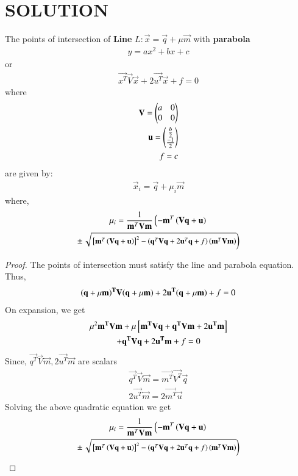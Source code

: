 \documentclass[journal,12pt,twocolumn]{IEEEtran}
\begin{document}
\section{SOLUTION}
\begin{lemma}
The points of intersection of \textbf{Line} $L:\vec{x}=\vec{q}+\mu\vec{m}$ with \textbf{parabola}
\begin{align}
    y=ax^2+bx+c
    \end{align}
    or
\begin{align}
\vec{x^T}\vec{V}\vec{x}+2\vec{u^T}\vec{x}+f=0
\end{align}
where
\begin{align}
    \mathbf{V}=\begin{pmatrix}a & 0 \\ 0 & 0\end{pmatrix}\\
    \mathbf{u}=\begin{pmatrix}\frac{b}{2}\\\frac{-1}{2}\end{pmatrix}\\
    f=c
\end{align}
are given by:
\begin{align}
\vec{x}_i = \vec{q}+\mu_i\vec{m}
\end{align}
%
where,
\begin{multline}
\mu_i = \frac{1}
{
\mathbf{m}^T\mathbf{V}\mathbf{m}
}
\left(-\mathbf{m}^T\left(\mathbf{V}\mathbf{q}+\mathbf{u}\right)\right.
\\
\pm
{\small
\ensuremath{\left.\sqrt{
{}\left[
\mathbf{m}^T\left(\mathbf{V}\mathbf{q}+\mathbf{u}\right)
\right]^2
-
\left(
\mathbf{q}^T\mathbf{V}\mathbf{q} + 2\mathbf{u}^T\mathbf{q} +f
\right)
\left(\mathbf{m}^T\mathbf{V}\mathbf{m}\right)
}
\right)}
}\label{quad}
\end{multline}
\end{lemma}
\begin{proof}
The points of intersection must satisfy the line and parabola equation.
Thus,
\begin{align}
\mathbf{\left(\mathbf{q}+\mu\mathbf{m}\right)^T}\mathbf{V}\mathbf{\left(\mathbf{q}+ \mu\mathbf{m}\right)}+2\mathbf{u^T}\mathbf{\left(\mathbf{q}+\mu\mathbf{m}\right)}+f=0
\end{align}
On expansion, we get
\begin{multline}
  \mu^2\mathbf{m^T}\mathbf{V}\mathbf{m}+ \mu{}\left[\mathbf{m^T}\mathbf{V}\mathbf{q}+\mathbf{q^T}\mathbf{V}\mathbf{m}+2\mathbf{u^T}\mathbf{m}\right]\\ + \mathbf{q^T}\mathbf{V}\mathbf{q}+2\mathbf{u^T}\mathbf{m}+f=0  
\end{multline}
Since, $\vec{q^T}\vec{V}\vec{m},2\vec{u^T}\vec{m}$ are scalars
\begin{align}
 \vec{q^T}\vec{V}\vec{m}=\vec{m^T}\vec{V^T}\vec{q} \\
 2\vec{u^T}\vec{m}=2\vec{m^T}\vec{u}
\end{align}
Solving the above quadratic equation we get
\begin{multline}
\mu_i = \frac{1}
{\mathbf{m}^T\mathbf{V}\mathbf{m}
}\left(-\mathbf{m}^T\left(\mathbf{V}\mathbf{q}+\mathbf{u}\right)\right.
\\\pm{\small
\ensuremath{\left.\sqrt{
{}\left[
\mathbf{m}^T\left(\mathbf{V}\mathbf{q}+\mathbf{u}\right)
\right]^2-\left(\mathbf{q}^T\mathbf{V}\mathbf{q} + 2\mathbf{u}^T\mathbf{q} +f
\right)\left(\mathbf{m}^T\mathbf{V}\mathbf{m}\right)
}\right)}}
\end{multline}
\end{proof}
\end{document}
